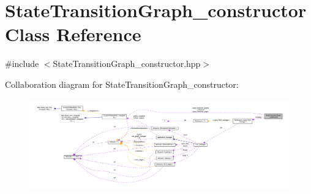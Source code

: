 \hypertarget{classStateTransitionGraph__constructor}{}\section{State\+Transition\+Graph\+\_\+constructor Class Reference}
\label{classStateTransitionGraph__constructor}


{\ttfamily \#include $<$State\+Transition\+Graph\+\_\+constructor.\+hpp$>$}



Collaboration diagram for State\+Transition\+Graph\+\_\+constructor\+:
\nopagebreak
\begin{figure}[H]
\begin{center}
\leavevmode
\includegraphics[width=350pt]{d3/dd6/classStateTransitionGraph__constructor__coll__graph}
\end{center}
\end{figure}
